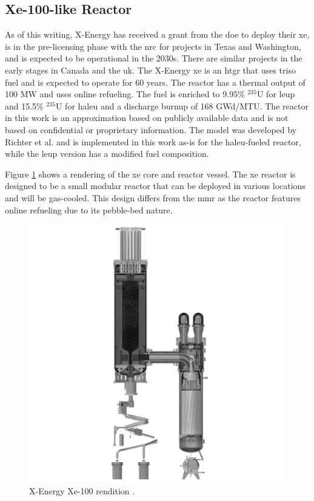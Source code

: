 \subsection{Xe-100-like Reactor}
\label{sec:xe}

As of this writing, X-Energy has received a grant from the \gls{doe} to deploy their \gls{xe}, is in the pre-licensing phase with the \gls{nrc} for projects in Texas and Washington, and is expected to be operational in the 2030s. There are similar projects in the early stages in Canada and the \gls{uk}. The X-Energy \gls{xe} is an \gls{htgr} that uses \gls{triso} fuel and is expected to operate for 60 years. The reactor has a thermal output of 100 MW and uses online refueling. The fuel is enriched to 9.95\% $^{235}$U for \gls{leup} and 15.5\% $^{235}$U for \gls{haleu} and a discharge burnup of 168 GWd/MTU. The reactor in this work is an approximation based on publicly available data and is not based on confidential or proprietary information. The model was developed by Richter et al. \cite{richter_xe100_like} and is implemented in this work as-is for the \gls{haleu}-fueled reactor, while the \gls{leup} version has a modified fuel composition.

Figure \ref{fig:xe_design} shows a rendering of the \gls{xe} core and reactor vessel. The \gls{xe} reactor is designed to be a small modular reactor that can be deployed in various locations and will be gas-cooled. This design differs from the \gls{mmr} as the reactor features online refueling due to its pebble-bed nature.

\begin{figure}[H]
    \centering
    \includegraphics[scale=0.09]{images/reactor_design/xe-100-reactor-slice.jpg}
    \caption{X-Energy Xe-100 rendition \cite{xe_reactor}.}
    \label{fig:xe_design}
\end{figure}

